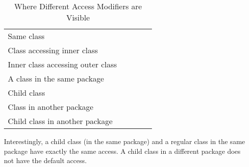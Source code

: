 \setlength{\tabcolsep}{5pt}
\begingroup
\noindent
\def\arraystretch{1.5}
\begin{table}[!htb]
\centering
\begin{tabulary}{\columnwidth}{ | p{0.55\columnwidth} | p{0.05\columnwidth} | p{0.05\columnwidth} | p{0.05\columnwidth}|p{0.05\columnwidth}|} 
\rot{\textbf{}} &  & &  & \\ \hline 
Same class &  &  &  &  \\ \hline
Class accessing inner class &  &  &  &  \\ \hline
Inner class accessing outer class &  &  &  &  \\ \hline
A class in the same package &  &  &  &  \\ \hline
Child class &  &  &  &  \\ \hline
Class in another package &  &  &  &  \\ \hline
Child class in another package &  &  &  &  \\ \hline
\end{tabulary}
\caption{Where Different Access Modifiers are Visible}\label{tab:accessmodifiers}
\end{table}
\endgroup

Interestingly, a child class (in the same package) and a regular class in the same package have exactly the same access. A child class in a different package does not have the default access.